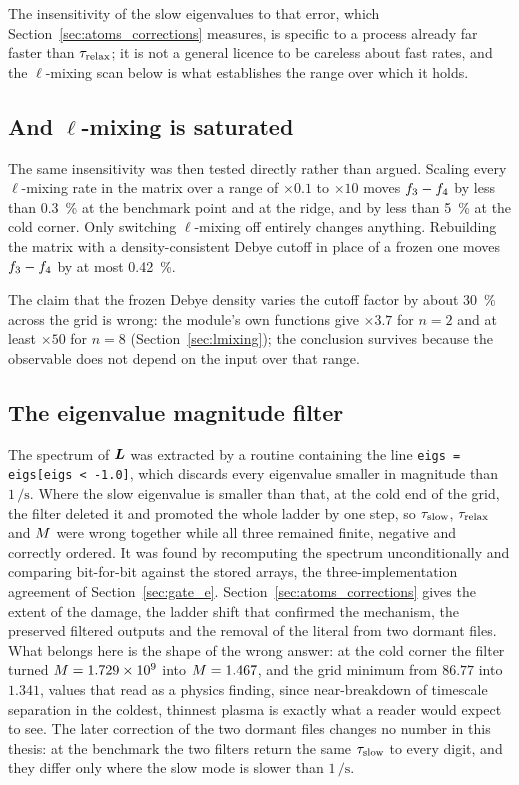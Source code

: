 The insensitivity of the slow eigenvalues to that error, which
Section~\ref{sec:atoms_corrections} measures, is specific to a process already
far faster than $\tau_{\mathrm{relax}}$; it is not a general licence to be careless about
fast rates, and the $\ell$-mixing scan below is what establishes the range over
which it holds.

\subsection{And $\ell$-mixing is saturated}

The same insensitivity was then tested directly rather than argued. Scaling
every $\ell$-mixing rate in the matrix over a range of $\times0.1$ to $\times10$
moves $f_{3}-f_{4}$ by less than \SI{0.3}{\percent} at the benchmark
point and at the ridge, and by less than \SI{5}{\percent} at the cold corner.
Only switching $\ell$-mixing off entirely changes anything. Rebuilding the
matrix with a density-consistent Debye cutoff in place of a frozen one moves
$f_{3}-f_{4}$ by at most \SI{0.42}{\percent}.

The claim that the frozen Debye density varies the cutoff factor by about
\SI{30}{\percent} across the grid is wrong: the module's own functions give
$\times3.7$ for $n=2$ and at least $\times50$ for $n=8$
(Section~\ref{sec:lmixing}); the conclusion survives because the observable does
not depend on the input over that range.

\subsection{The eigenvalue magnitude filter}

The spectrum of $\bm{L}$ was extracted by a routine containing the line
\texttt{eigs = eigs[eigs < -1.0]}, which discards every eigenvalue smaller in
magnitude than $1\,\si{\per\second}$. Where the slow eigenvalue is smaller than
that, at the cold end of the grid, the filter deleted it and promoted the whole
ladder by one step, so $\tau_{\mathrm{slow}}$, $\tau_{\mathrm{relax}}$ and $M$ were wrong together
while all three remained finite, negative and correctly ordered. It was found by
recomputing the spectrum unconditionally and comparing bit-for-bit against the
stored arrays, the three-implementation agreement of Section~\ref{sec:gate_e}.
Section~\ref{sec:atoms_corrections} gives the extent of the damage, the ladder
shift that confirmed the mechanism, the preserved filtered outputs and the
removal of the literal from two dormant files. What belongs here is the shape
of the wrong answer: at the cold corner the filter turned
$M = 1.729\times10^{9}$ into $M = 1.467$, and the grid minimum from
$86.77$ into $1.341$, values that read as a physics finding, since
near-breakdown of timescale separation in the coldest, thinnest plasma is
exactly what a reader would expect to see. The later correction of the two
dormant files changes no number in this thesis: at the benchmark the two filters
return the same $\tau_{\mathrm{slow}}$ to every digit, and they differ only where the slow
mode is slower than $1\,\si{\per\second}$.

